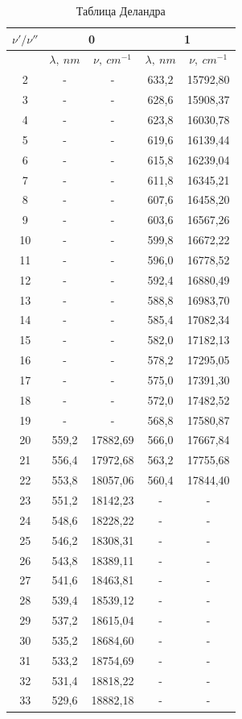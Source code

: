 \documentclass{article}
\begin{document}
\begin{table}[h!]
    \centering
    \caption{Таблица Деландра}
    \begin{tabular}{|c|c|c|c|c|} \hline 
          $\nu '/  \nu ''$&  \multicolumn{2}{|c|}{0}&\multicolumn{2}{|c|}{1}\\ \hline 
         &  $\lambda,~nm$&  $\nu, ~cm^{-1}$ &$\lambda,~nm$&  $\nu, ~cm^{-1}$\\ \hline 
         2&  -
&   -
&633,2&  15792,80\\ \hline 
         3&  -
&   -
&628,6&  15908,37\\ \hline 
         4&  -
&   -
&623,8&  16030,78\\ \hline 
         5&  -
&   -
&619,6&  16139,44\\ \hline 
         6&  -
&   -
&615,8&  16239,04\\ \hline 
         7&  -
&   -
&611,8&  16345,21\\ \hline 
         8&  -
&   -
&607,6&  16458,20\\ \hline 
         9&  -
&   -
&603,6&  16567,26\\ \hline
 10& -
& -
& 599,8& 16672,22\\\hline
 11& -
& -
& 596,0& 16778,52\\\hline
 12& -
& -
& 592,4& 16880,49\\\hline
 13& -
& -
& 588,8& 16983,70\\\hline
 14& -
& -
& 585,4& 17082,34\\\hline
 15
& -
& -
& 582,0& 17182,13\\\hline
 16
& -
& -
& 578,2& 17295,05\\\hline
 17
& -
& -
& 575,0& 17391,30\\\hline
 18
& -
& -
& 572,0& 17482,52\\\hline
 19
& -& -& 568,8
& 17580,87\\\hline
 20
& 559,2& 17882,69& 566,0& 17667,84\\\hline
 21
& 556,4& 17972,68& 563,2& 17755,68\\\hline
 22& 553,8& 18057,06& 560,4& 17844,40\\\hline
 23& 551,2& 18142,23& -
& -
\\\hline
 24& 548,6& 18228,22& -
& -
\\\hline
 25& 546,2& 18308,31& -
& -
\\\hline
 26& 543,8
& 18389,11& -
& -
\\\hline
 27& 541,6
& 18463,81& -
& -
\\\hline
 28& 539,4& 18539,12& -
& -
\\\hline
 29& 537,2& 18615,04& -
& -
\\\hline
 30& 535,2& 18684,60& -
& -
\\\hline
 31& 533,2& 18754,69& -
& -
\\\hline
 32& 531,4& 18818,22& -
& -
\\\hline
 33& 529,6& 18882,18& -
& -
\\\hline
    \end{tabular}
    
    \label{tab:delandra}
\end{table}
\end{document}
